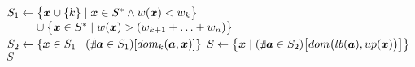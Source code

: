 \begin{algorithmic}[1]
    \State $S_1 \gets \big\{\boldsymbol{x} \cup \{k\} \;|\; \boldsymbol{x}
      \in S^* \wedge w(\boldsymbol{x}) < w_k \big\}$
      \State $\phantom{S_1 \gets } \cup \big\{ \boldsymbol{x} \in S^* \;|\; w(\boldsymbol{x}) > (w_{k+1} + \ldots + w_n)\big\}$
    \State $S_2 \gets \{\boldsymbol{x} \in S_1 \;|\; (\nexists \boldsymbol{a} \in S_1)[dom_k(\boldsymbol{a}, \boldsymbol{x})] \}$
    \State $S \gets \big\{ \boldsymbol{x} \;|\; (\nexists \boldsymbol{a} \in S_2)\big[dom\big(lb(\boldsymbol{a}), up(\boldsymbol{x})\big)\big]\big\}$
  \State \Return $S$
  \EndFunction
\end{algorithmic}
